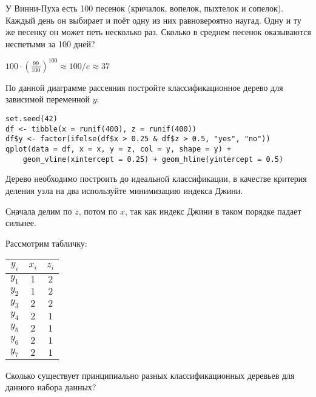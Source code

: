 \begin{problem}
У Винни-Пуха есть 100 песенок (кричалок, вопелок, пыхтелок и сопелок). 
Каждый день он выбирает и поёт одну из них равновероятно наугад. 
Одну и ту же песенку он может петь несколько раз. 
Сколько в среднем песенок оказываются неспетыми за 100 дней?


\begin{sol}
$100\cdot \left(\frac{99}{100} \right)^{100}\approx 100/e \approx 37$
\end{sol}
\end{problem}


\begin{problem}
По данной диаграмме рассеяния постройте классификационное дерево для зависимой переменной $y$:

\begin{verbatim}
set.seed(42)
df <- tibble(x = runif(400), z = runif(400))
df$y <- factor(ifelse(df$x > 0.25 & df$z > 0.5, "yes", "no"))
qplot(data = df, x = x, y = z, col = y, shape = y) +
    geom_vline(xintercept = 0.25) + geom_hline(yintercept = 0.5)
\end{verbatim}


\begin{minipage}{0.6\textwidth}
\begin{center}
\begin{tikzpicture}[scale = 0.025]

\end{tikzpicture}
\end{center}
\end{minipage}

Дерево необходимо построить до идеальной классификации, 
в качестве критерия деления узла на два используйте минимизацию индекса Джини.



\begin{sol}
Сначала делим по $z$, потом по $x$, так как индекс Джини в таком порядке падает сильнее.
\end{sol}
\end{problem}


\begin{problem}
Рассмотрим табличку:

\begin{tabular}{ccc}
\toprule
$y_i$ & $x_i$ & $z_i$ \\
\midrule
$y_1$ & $1$ & $2$ \\
$y_2$ & $1$ & $2$ \\
$y_3$ & $2$ & $2$ \\
$y_4$ & $2$ & $1$\\
$y_5$ & $2$ & $1$ \\
$y_6$ & $2$ & $1$ \\
$y_7$ & $2$ & $1$ \\
\bottomrule
\end{tabular}

Сколько существует принципиально разных классификационных деревьев для данного набора данных?
\begin{sol}

\end{sol}
\end{problem}



